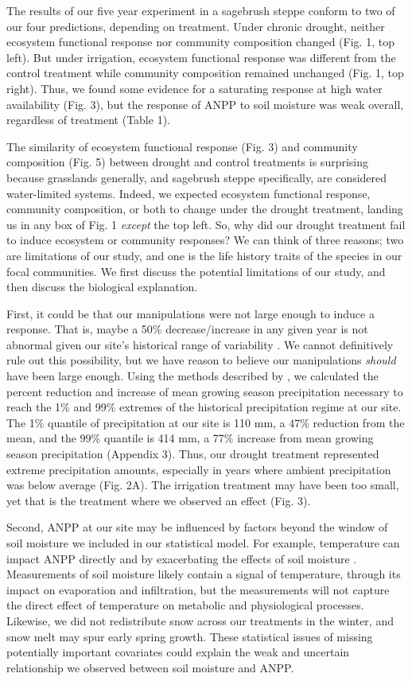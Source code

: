 \documentclass[fleqn,10pt,lineno]{wlpeerj} %
\begin{document}
The results of our five year experiment in a sagebrush steppe conform to
two of our four predictions, depending on treatment. Under chronic
drought, neither ecosystem functional response nor community composition
changed (Fig. 1, top left). But under irrigation, ecosystem functional
response was different from the control treatment while community
composition remained unchanged (Fig. 1, top right). Thus, we found some
evidence for a saturating response at high water availability (Fig. 3),
but the response of ANPP to soil moisture was weak overall, regardless
of treatment (Table 1).

The similarity of ecosystem functional response (Fig. 3) and community
composition (Fig. 5) between drought and control treatments is
surprising because grasslands generally, and sagebrush steppe
specifically, are considered water-limited systems. Indeed, we expected
ecosystem functional response, community composition, or both to change
under the drought treatment, landing us in any box of Fig. 1
\emph{except} the top left. So, why did our drought treatment fail to
induce ecosystem or community responses? We can think of three reasons;
two are limitations of our study, and one is the life history traits of
the species in our focal communities. We first discuss the potential
limitations of our study, and then discuss the biological explanation.

First, it could be that our manipulations were not large enough to
induce a response. That is, maybe a 50\% decrease/increase in any given
year is not abnormal given our site's historical range of variability
\citep{Knapp2017}. We cannot definitively rule out this possibility, but
we have reason to believe our manipulations \emph{should} have been
large enough. Using the methods described by \citet{Lemoine2016}, we
calculated the percent reduction and increase of mean growing season
precipitation necessary to reach the 1\% and 99\% extremes of the
historical precipitation regime at our site. The 1\% quantile of
precipitation at our site is 110 mm, a 47\% reduction from the mean, and
the 99\% quantile is 414 mm, a 77\% increase from mean growing season
precipitation (Appendix 3). Thus, our drought treatment represented
extreme precipitation amounts, especially in years where ambient
precipitation was below average (Fig. 2A). The irrigation treatment may
have been too small, yet that is the treatment where we observed an
effect (Fig. 3).

Second, ANPP at our site may be influenced by factors beyond the window
of soil moisture we included in our statistical model. For example,
temperature can impact ANPP directly \citep{Epstein1997} and by
exacerbating the effects of soil moisture \citep{DeBoeck2011}.
Measurements of soil moisture likely contain a signal of temperature,
through its impact on evaporation and infiltration, but the measurements
will not capture the direct effect of temperature on metabolic and
physiological processes. Likewise, we did not redistribute snow across
our treatments in the winter, and snow melt may spur early spring
growth. These statistical issues of missing potentially important
covariates could explain the weak and uncertain relationship we observed
between soil moisture and ANPP.
\end{document}
